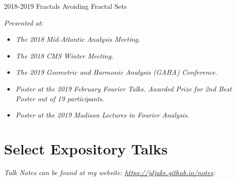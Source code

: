 \documentclass[a4paper]{cv-friggeri}
\begin{document}
\begin{entrylist}
\entry
{2018-2019}
{Fractals Avoiding Fractal Sets}
{}
{\emph{Presented at}:
%
\begin{itemize}
	\item \emph{The 2018 Mid-Atlantic Analysis Meeting}.
	\item \emph{The 2018 CMS Winter Meeting}.
	\item \emph{The 2019 Geometric and Harmonic Analysis (GAHA) Conference}.
	\item \emph{Poster at the 2019 February Fourier Talks. Awarded Prize for 2nd Best Poster out of 19 participants}.
	\item \emph{Poster at the 2019 Madison Lectures in Fourier Analysis}.
\end{itemize}
%
}

\end{entrylist}

\section{Select Expository Talks}

\emph{Talk Notes can be found at my website: \href{https://jdjake.github.io/notes}{https://jdjake.github.io/notes}:}
\\
\end{document}
